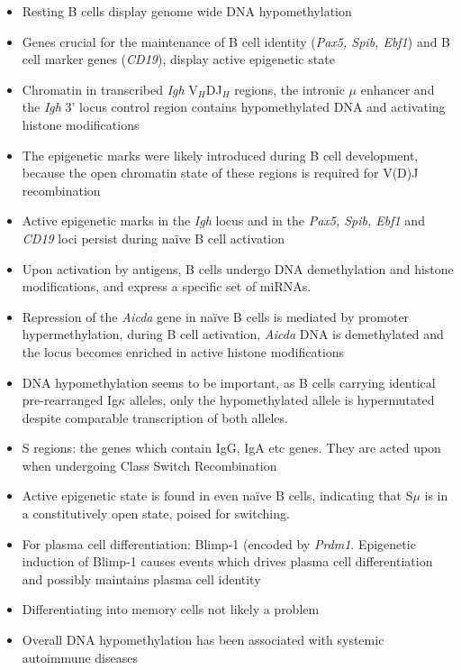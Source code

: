 \documentclass[12pt]{article}
\newcommand{\naive}{na\"{i}ve }
\begin{document}
	\begin{itemize}
		\item Resting B cells display genome wide DNA hypomethylation
		\item Genes crucial for the maintenance of B cell identity (\textit{Pax5, Spib, Ebf1}) and B cell marker genes (\textit{CD19}), display active epigenetic state
		\item Chromatin in transcribed \textit{Igh} V$_H$DJ$_H$ regions, the intronic $\mu$ enhancer and the \textit{Igh} 3' locus control region contains hypomethylated DNA and activating histone modifications
		\item The epigenetic marks were likely introduced during B cell development, because the open chromatin state of these regions is required for V(D)J recombination
		\item Active epigenetic marks in the \textit{Igh} locus and in the \textit{Pax5, Spib, Ebf1} and \textit{CD19} loci persist during na\"{i}ve B cell activation
		\item Upon activation by antigens, B cells undergo DNA demethylation and histone modifications, and express a specific set of miRNAs.
		\item Repression of the \textit{Aicda} gene in \naive B cells is mediated by promoter hypermethylation, during B cell activation, \textit{Aicda} DNA is demethylated and the locus becomes enriched in active histone modifications
		\item DNA hypomethylation seems to be important, as B cells carrying identical pre-rearranged Ig$\kappa$ alleles, only the hypomethylated allele is hypermutated despite comparable transcription of both alleles.
		\item S regions: the genes which contain IgG, IgA etc genes. They are acted upon when undergoing Class Switch Recombination
		\item Active epigenetic state is found in even \naive B cells, indicating that S$\mu$ is in a constitutively open state, poised for switching.
		\item For plasma cell differentiation: Blimp-1 (encoded by \textit{Prdm1}. Epigenetic induction of Blimp-1 causes events which drives plasma cell differentiation and possibly maintains plasma cell identity
		\item Differentiating into memory cells not likely a problem
		\item Overall DNA hypomethylation has been associated with systemic autoimmune diseases
	\end{itemize}
	
\end{document}
